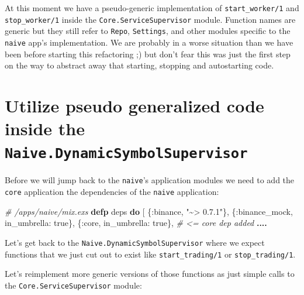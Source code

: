 \documentclass[
]{book}
\newenvironment{Shaded}{\begin{snugshade}}{\end{snugshade}}
\newcommand{\CommentTok}[1]{\textcolor[rgb]{0.56,0.35,0.01}{\textit{#1}}}
\newcommand{\ConstantTok}[1]{\textcolor[rgb]{0.00,0.00,0.00}{#1}}
\newcommand{\KeywordTok}[1]{\textcolor[rgb]{0.13,0.29,0.53}{\textbf{#1}}}
\newcommand{\NormalTok}[1]{#1}
\newcommand{\OperatorTok}[1]{\textcolor[rgb]{0.81,0.36,0.00}{\textbf{#1}}}
\newcommand{\StringTok}[1]{\textcolor[rgb]{0.31,0.60,0.02}{#1}}
\newcommand{\VariableTok}[1]{\textcolor[rgb]{0.00,0.00,0.00}{#1}}
\begin{document}
At this moment we have a pseudo-generic implementation of \texttt{start\_worker/1} and \texttt{stop\_worker/1} inside the \texttt{Core.ServiceSupervisor} module. Function names are generic but they still refer to \texttt{Repo}, \texttt{Settings}, and other modules specific to the \texttt{naive} app's implementation. We are probably in a worse situation than we have been before starting this refactoring ;) but don't fear this was just the first step on the way to abstract away that starting, stopping and autostarting code.

\hypertarget{utilize-pseudo-generalized-code-inside-the-naive.dynamicsymbolsupervisor}{%
\section{\texorpdfstring{Utilize pseudo generalized code inside the \texttt{Naive.DynamicSymbolSupervisor}}{Utilize pseudo generalized code inside the Naive.DynamicSymbolSupervisor}}\label{utilize-pseudo-generalized-code-inside-the-naive.dynamicsymbolsupervisor}}

Before we will jump back to the \texttt{naive}'s application modules we need to add the \texttt{core} application the dependencies of the \texttt{naive} application:

\begin{Shaded}
\begin{Highlighting}[]
  \CommentTok{\# /apps/naive/mix.exs}
  \KeywordTok{defp}\NormalTok{ deps }\KeywordTok{do}
\NormalTok{    [}
\NormalTok{      \{}\VariableTok{:binance}\NormalTok{, }\StringTok{"\textasciitilde{}\textgreater{} 0.7.1"}\NormalTok{\},}
\NormalTok{      \{}\VariableTok{:binance\_mock}\NormalTok{, }\VariableTok{in\_umbrella:} \ConstantTok{true}\NormalTok{\},}
\NormalTok{      \{}\VariableTok{:core}\NormalTok{, }\VariableTok{in\_umbrella:} \ConstantTok{true}\NormalTok{\}, }\CommentTok{\# \textless{}= core dep added }
      \OperatorTok{....}
\end{Highlighting}
\end{Shaded}

Let's get back to the \texttt{Naive.DynamicSymbolSupervisor} where we expect functions that we just cut out to exist like \texttt{start\_trading/1} or \texttt{stop\_trading/1}.

Let's reimplement more generic versions of those functions as just simple calls to the \texttt{Core.ServiceSupervisor} module:
\end{document}
